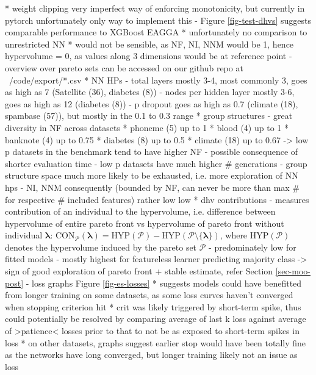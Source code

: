 \documentclass[twoside,11pt]{article}
\begin{document}
      * weight clipping very imperfect way of enforcing monotonicity, but currently in pytorch unfortunately only way to implement this
- Figure \ref{fig-test-dhvs} suggests comparable performance to XGBoost EAGGA
  * unfortunately no comparison to unrestricted NN
  * would not be sensible, as NF, NI, NNM would be 1, hence hypervolume = 0, as values along 3 dimensions would be at reference point
- overview over pareto sets can be accessed on our github repo at ~/code/export/*.csv
  * NN HPs
    - total layers mostly 3-4, most commonly 3, goes as high as 7 (Satellite (36), diabetes (8))
    - nodes per hidden layer mostly 3-6, goes as high as 12 (diabetes (8))
    - p dropout goes as high as 0.7 (climate (18), spambase (57)), but mostly in the 0.1 to 0.3 range
  * group structures
    - great diversity in NF across datasets
      * phoneme (5) up to 1
      * blood (4) up to 1
      * banknote (4) up to 0.75
      * diabetes (8) up to 0.5
      * climate (18) up to 0.67
      -> low p datasets in the benchmark tend to have higher NF
        - possible consequence of shorter evaluation time
        - low p datasets have much higher \# generations
        - group structure space much more likely to be exhausted, i.e. more exploration of NN hps
    - NI, NNM consequently (bounded by NF, can never be more than max \# for respective \# included features) rather low low
  * dhv contributions
    - measures contribution of an individual to the hypervolume, i.e. difference between hypervolume of entire pareto front vs hypervolume of pareto front without
      individual $\boldsymbol\lambda$: $\text{CON}_{\mathcal{P}}(\boldsymbol\lambda)=\text{HYP}(\mathcal{P})-\text{HYP}(\mathcal{P}\setminus\{\boldsymbol\lambda\})$,
      where $\text{HYP}(\mathcal{P})$ denotes the hypervolume induced by the pareto set $\mathcal{P}$ \citep[p. 384]{10.5555/1943267.1943271}
    - predominately low for fitted models
    - mostly highest for featureless learner predicting majority class
    -> sign of good exploration of pareto front + stable estimate, refer Section \ref{sec-moo-post}
- loss graphs Figure \ref{fig-es-losses}
  * suggests models could have benefitted from longer training on some datasets, as some loss curves haven't converged when stopping criterion hit
  * crit was likely triggered by short-term spike, thus could potentially be resolved by comparing average of last k loss against average of >patience< losses prior
    to that to not be as exposed to short-term spikes in loss
  * on other datasets, graphs suggest earlier stop would have been totally fine as the networks have long converged, but longer training likely not an issue as loss
\end{document}
